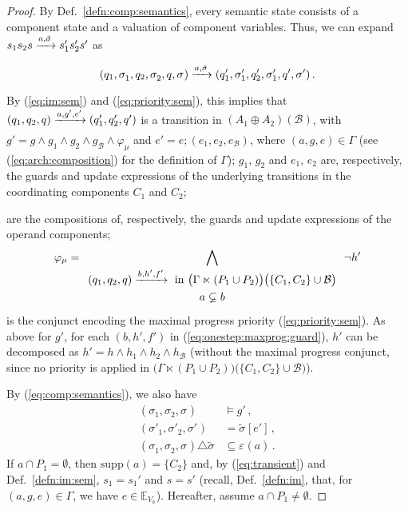 \documentclass{llncs}
\newcommand{\defn}[1]{Def.~\ref{defn:#1}}
\newcommand{\eq}[1]{(\ref{eq:#1})}
\newcommand{\cB}{\ensuremath{\mathcal{B}}}
\newcommand{\sE}{\ensuremath{\mathbb{E}}}
\newcommand{\goesto}[2][]{\ensuremath{\xrightarrow[{#1}\relax]{#2}}}
\newcommand{\exprs}[1]{\ensuremath{\sE_{#1}}}
\newcommand{\val}[3][]{\ensuremath{#1{\sigma}^{#2}_{#3}}}
\newcommand{\primeit}[1]{#1'}
\newcommand{\export}[1][]{\ensuremath{\varepsilon_{#1}}}
\newcommand{\valdiff}[2]{\ensuremath{#1 \triangle #2}}
\newcommand{\supp}[1]{\ensuremath{\mathrm{supp}(#1)}}
\newcommand{\IMextend}[2]{\ensuremath{#1 \ltimes #2}}
\newcommand{\arcomp}{\oplus}
\begin{document}
\begin{proof}
  By \defn{comp:semantics}, every semantic state consists of a
  component state and a valuation of component variables.  Thus,
  we can expand $s_1 s_2 s \goesto{a, \tilde{\val{}{}}} s_1' s_2' s'$
  as
%
  \[
  (q_1, \val{}{1}, q_2, \val{}{2}, q, \val{}{})
%
  \goesto{a, \tilde{\val{}{}}}
%
  (q_1', \val[\primeit]{}{1}, q_2', \val[\primeit]{}{1}, q', \val[\primeit]{}{})
  \,.
  \]
%
  By \eq{im:sem} and \eq{priority:sem}, this implies
  that
  $(q_1, q_2, q) \goesto {a, g', e'} (q_1', q_2', q')$
  is a transition in $(A_1 \arcomp A_2)(\cB)$, with
%
  $g' = g \land g_1 \land g_2 \land g_\cB \land \varphi_\mu$
  and
  $e' = e; (e_1, e_2, e_\cB)$,
  where $(a, g, e) \in \Gamma$ (see \eq{arch:composition} for the
  definition of $\Gamma$);
%  
  $g_1$, $g_2$ and $e_1$, $e_2$ are, respectively, the guards and
  update expressions of the underlying transitions in the coordinating
  components $C_1$ and $C_2$;
%    
%
  are the compositions of, respectively, the guards and update
  expressions of the operand components;
%    
  \begin{equation}
    \label{eq:onestep:maxprog:guard}
    \varphi_\mu = \bigwedge_{
      \begin{array}{c}
        (q_1, q_2, q) \goesto{b, h', f'} \text{ in }
        \bigl(\IMextend{\Gamma}{(P_1 \cup P_2)}\bigr)
        \bigl(\{C_1, C_2\} \cup \cB\bigr)
        \\
        a \varsubsetneq b
      \end{array}
    } \lnot h'
  \end{equation}
%
  is the conjunct encoding the maximal progress priority
  \eq{priority:sem}.  As above for $g'$, for each $(b, h', f')$ in
  \eq{onestep:maxprog:guard}, $h'$ can be decomposed as $h' = h \land
  h_1 \land h_2 \land h_\cB$ (without the maximal progress conjunct,
  since no priority is applied in $\bigl(\IMextend{\Gamma}{(P_1 \cup
    P_2)}\bigr)\bigl(\{C_1, C_2\} \cup \cB\bigr)$).
  
  By \eq{comp:semantics}, we also have
%
  \begin{align}
    \label{eq:guard}
    (\val{}{1}, \val{}{2}, \val{}{}) &\models g'
    \,,
    \\
    \label{eq:substitution}
    (\val[\primeit]{}{1}, \val[\primeit]{}{2}, \val[\primeit]{}{})
    &= \val[\tilde]{}{}[e']
    \,,
    \\
    \label{eq:transient}
    \valdiff{(\val{}{1}, \val{}{2}, \val{}{})}{\val[\tilde]{}{}}
    &\subseteq \export(a)
    \,.
  \end{align}
%
  If $a \cap P_1 = \emptyset$, then $\supp{a} = \{C_2\}$ and, by
  \eq{transient} and \defn{im:sem}, $s_1 = s_1'$ and $s = s'$
  (recall, \defn{im}, that, for $(a,g,e) \in \Gamma$, we have $e
  \in \exprs{V_a}$).  Hereafter, assume $a \cap P_1 \neq
  \emptyset$.


\end{proof}
\end{document}
